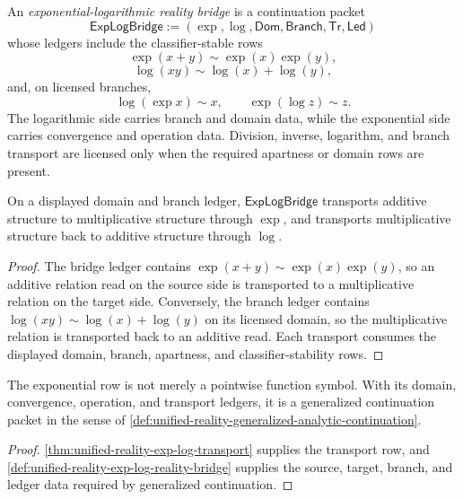 \begin{definition}
\label{def:unified-reality-exp-log-reality-bridge}
An \emph{exponential-logarithmic reality bridge} is a continuation
packet
$$
\mathsf{ExpLogBridge}
:=
(\exp,\log,\mathsf{Dom},\mathsf{Branch},\mathsf{Tr},\mathsf{Led})
$$
whose ledgers include the classifier-stable rows
$$
\exp(x+y)\sim \exp(x)\exp(y),
$$
$$
\log(xy)\sim \log(x)+\log(y),
$$
and, on licensed branches,
$$
\log(\exp x)\sim x,
\qquad
\exp(\log z)\sim z.
$$
The logarithmic side carries branch and domain data, while the
exponential side carries convergence and operation data. Division,
inverse, logarithm, and branch transport are licensed only when the
required apartness or domain rows are present.
\end{definition}

\begin{theorem}
\label{thm:unified-reality-exp-log-transport}
On a displayed domain and branch ledger,
$\mathsf{ExpLogBridge}$ transports additive structure to multiplicative
structure through $\exp$, and transports multiplicative structure back
to additive structure through $\log$.
\end{theorem}

\begin{proof}
The bridge ledger contains $\exp(x+y)\sim\exp(x)\exp(y)$, so an additive
relation read on the source side is transported to a multiplicative
relation on the target side. Conversely, the branch ledger contains
$\log(xy)\sim\log(x)+\log(y)$ on its licensed domain, so the
multiplicative relation is transported back to an additive read. Each
transport consumes the displayed domain, branch, apartness, and
classifier-stability rows.
\end{proof}

\begin{corollary}
\label{cor:unified-reality-exp-is-reality-bridge}
The exponential row is not merely a pointwise function symbol. With its
domain, convergence, operation, and transport ledgers, it is a
generalized continuation packet in the sense of
\autoref{def:unified-reality-generalized-analytic-continuation}.
\end{corollary}

\begin{proof}
\autoref{thm:unified-reality-exp-log-transport} supplies the transport
row, and
\autoref{def:unified-reality-exp-log-reality-bridge} supplies the
source, target, branch, and ledger data required by generalized
continuation.
\end{proof}

